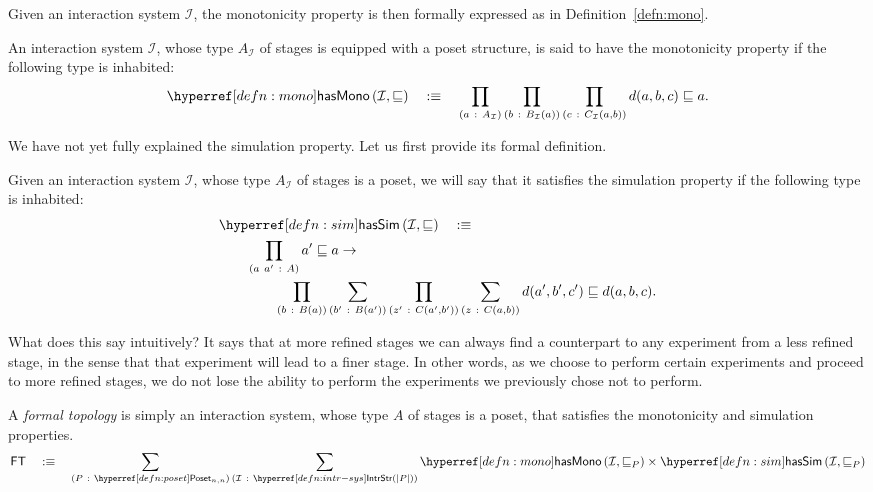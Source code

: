 Given an interaction system $\mathcal{I}$, the monotonicity property is then formally
expressed as in Definition~\ref{defn:mono}.
\begin{defn}\label{defn:mono}
  An interaction system $\mathcal{I}$, whose type $A_{\mathcal{I}}$ of stages is equipped
  with a poset structure, is said to have the monotonicity property if the following type
  is inhabited:
  \begin{equation*}
    \hasmono{\mathcal{I}, \sqsubseteq} \quad\is\quad
      \pity{a}{A_{\mathcal{I}}}{%
        \pity{b}{B_{\mathcal{I}}(a)}{%
          \pity{c}{C_{\mathcal{I}}(a, b)}{%
              d(a, b, c) \sqsubseteq a
          }
        }
      }.
  \end{equation*}
\end{defn}

We have not yet fully explained the simulation property. Let us first provide its formal
definition.
\begin{defn}\label{defn:sim}
  Given an interaction system $\mathcal{I}$, whose type $A_{\mathcal{I}}$ of stages is a
  poset, we will say that it satisfies the simulation property if the following type is
  inhabited:
  \begin{align*}
    &\hassim{\mathcal{I}, \sqsubseteq} \quad\is \\
    &\hspace{2em}\pity{a~a'}{A}{%
      a' \sqsubseteq a \rightarrow\\
      &\hspace{4em}\pity{b}{B(a)}{
        \sigmaty{b'}{B(a')}{
          \pity{z'}{C(a', b')}{
            \sigmaty{z}{C(a, b)}{
              d(a', b', c') \sqsubseteq d(a, b, c)
            }
          }
        }
      }
    }.
  \end{align*}
\end{defn}
What does this say intuitively? It says that at more refined stages we can always find a
counterpart to any experiment from a less refined stage, in the sense that that experiment
will lead to a finer stage. In other words, as we choose to perform certain experiments
and proceed to more refined stages, we do not lose the ability to perform the experiments
we previously chose not to perform.

\begin{defn}\label{defn:formal-topo}
  A \emph{formal topology} is simply an interaction system, whose type $A$ of stages is a
  poset, that satisfies the monotonicity and simulation properties.
  \begin{align*}
    \mathsf{FT} \quad\is\quad \sigmaty{P}{\poset{}_{n, n}}{%
      \sigmaty{\mathcal{I}}{\treestr{\abs{P}}}
        \hasmono{\mathcal{I}, \sqsubseteq_P} \times \hassim{\mathcal{I}, \sqsubseteq_P}
    }
  \end{align*}
\end{defn}


